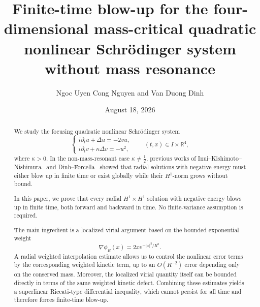 \documentclass[12pt]{amsart}
\title[Finite-time blow-up for a quadratic NLS system]{Finite-time blow-up for the four-dimensional mass-critical quadratic nonlinear Schr\"odinger system without mass resonance}
\author[N.~U.~C.~Nguyen, V.~D.~Dinh]{Ngoc Uyen Cong Nguyen and Van Duong Dinh}
\date{August 18, 2026}
\numberwithin{equation}{section}
\theoremstyle{remark}
\begin{document}
\begin{abstract}
We study the focusing quadratic nonlinear Schr\"odinger system
\[
\begin{cases}
 i\partial_t u+\Delta u=-2v\overline{u},\\
 i\partial_t v+\kappa\Delta v=-u^2,
\end{cases}
\qquad (t,x)\in I\times\mathbb R^4,
\]
where $\kappa>0$. In the non-mass-resonant case $\kappa\neq \frac12$, previous works of Inui--Kishimoto--Nishimura~\cite{IKN} and Dinh--Forcella~\cite{DF} showed that radial solutions with negative energy must either blow up in finite time or exist globally while their $H^1$-norm grows without bound.

In this paper, we prove that every radial $H^1\times H^1$ solution with negative energy blows up in finite time, both forward and backward in time. No finite-variance assumption is required.

The main ingredient is a localized virial argument based on the bounded exponential weight
\[
\nabla\phi_R(x)=2x e^{-|x|^2/R^2}.
\]
A radial weighted interpolation estimate allows us to control the nonlinear error terms by the corresponding weighted kinetic term, up to an $O(R^{-2})$ error depending only on the conserved mass. Moreover, the localized virial quantity itself can be bounded directly in terms of the same weighted kinetic defect. Combining these estimates yields a superlinear Riccati-type differential inequality, which cannot persist for all time and therefore forces finite-time blow-up.
\end{abstract}

\maketitle
\end{document}
